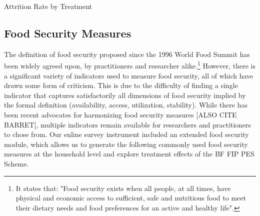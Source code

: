 \documentclass[preprint,12pt]{elsarticle}
\begin{document}
\begin{table}[ht!]
	\caption{Attrition Rate by Treatment}
	\centering
\begin{adjustbox}{max width=1.0\linewidth}

		\label{tab:Attrition_byTraitement}
\end{adjustbox}
\end{table}
\FloatBarrier


\subsection{Food Security Measures}
The definition of food security proposed since the 1996 World Food Summit has been widely agreed upon, by practitioners and researcher alike.\footnote{It states that: "Food security exists when all people, at all times, have physical and economic access to sufficient, safe and nutritious food to meet their dietary needs and food preferences for an active and healthy life".} However, there is a significant variety of indicators used to measure food security, all of which have drawn some form of criticism. This is due to the difficulty of finding a single indicator that captures satisfactorily all dimensions of food security implied by the formal definition (availability, access, utilization, stability). While there has been recent advocates for harmonizing food security measures \cite{carletto2013towards} [ALSO CITE BARRET], multiple indicators remain available for researchers and practitioners to chose from.   
Our enline survey instrument included an extended food security module, which allows us to generate the following commonly used food security measures at the household level and explore treatment effects of the BF FIP PES Scheme.  \par
\end{document}
